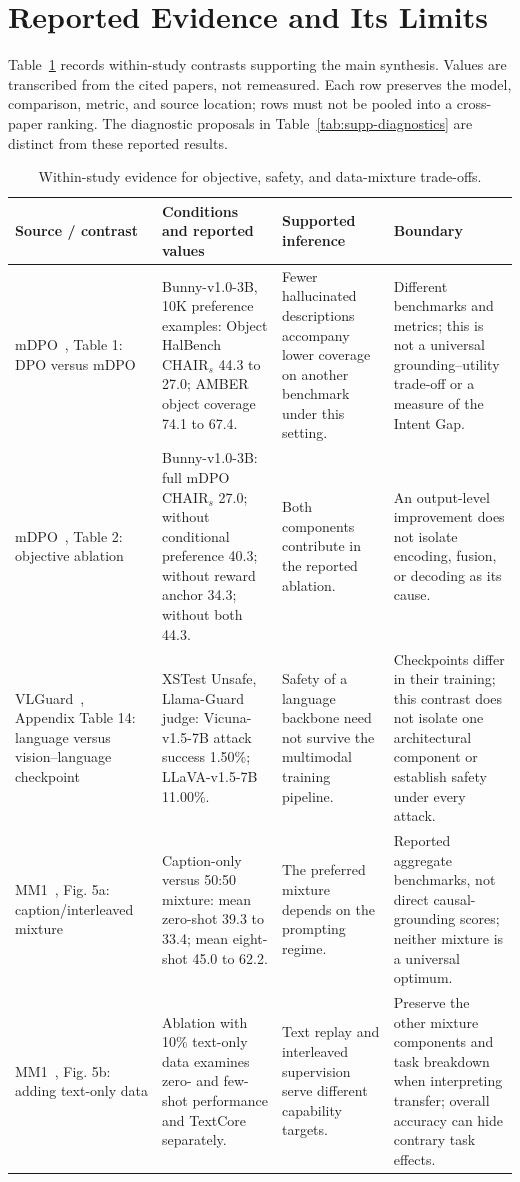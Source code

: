 \documentclass[10pt,onecolumn,journal,compsoc]{IEEEtran}
\begin{document}
\section{Reported Evidence and Its Limits}
Table~\ref{tab:supp-evidence} records within-study contrasts supporting the main synthesis. Values are transcribed from the cited papers, not remeasured. Each row preserves the model, comparison, metric, and source location; rows must not be pooled into a cross-paper ranking. The diagnostic proposals in Table~\ref{tab:supp-diagnostics} are distinct from these reported results.
\begin{table}[H]
\caption{Within-study evidence for objective, safety, and data-mixture trade-offs.}
\label{tab:supp-evidence}
\centering\small
\setlength{\tabcolsep}{5pt}\renewcommand{\arraystretch}{1.22}
\begin{tabularx}{\textwidth}{>{\raggedright\arraybackslash}p{}XXX}
\toprule\rowcolor{surveyheader}
\textbf{Source / contrast} & \textbf{Conditions and reported values} & \textbf{Supported inference} & \textbf{Boundary}\\\midrule
mDPO~\cite{wang2024mdpo}, Table 1: DPO versus mDPO & Bunny-v1.0-3B, 10K preference examples: Object HalBench CHAIR$_s$ 44.3 to 27.0; AMBER object coverage 74.1 to 67.4. & Fewer hallucinated descriptions accompany lower coverage on another benchmark under this setting. & Different benchmarks and metrics; this is not a universal grounding--utility trade-off or a measure of the Intent Gap.\\
mDPO~\cite{wang2024mdpo}, Table 2: objective ablation & Bunny-v1.0-3B: full mDPO CHAIR$_s$ 27.0; without conditional preference 40.3; without reward anchor 34.3; without both 44.3. & Both components contribute in the reported ablation. & An output-level improvement does not isolate encoding, fusion, or decoding as its cause.\\
VLGuard~\cite{zong2024vlguard}, Appendix Table 14: language versus vision--language checkpoint & XSTest Unsafe, Llama-Guard judge: Vicuna-v1.5-7B attack success 1.50\%; LLaVA-v1.5-7B 11.00\%. & Safety of a language backbone need not survive the multimodal training pipeline. & Checkpoints differ in their training; this contrast does not isolate one architectural component or establish safety under every attack.\\
MM1~\cite{mckinzie2024mm1}, Fig. 5a: caption/interleaved mixture & Caption-only versus 50:50 mixture: mean zero-shot 39.3 to 33.4; mean eight-shot 45.0 to 62.2. & The preferred mixture depends on the prompting regime. & Reported aggregate benchmarks, not direct causal-grounding scores; neither mixture is a universal optimum.\\
MM1~\cite{mckinzie2024mm1}, Fig. 5b: adding text-only data & Ablation with 10\% text-only data examines zero- and few-shot performance and TextCore separately. & Text replay and interleaved supervision serve different capability targets. & Preserve the other mixture components and task breakdown when interpreting transfer; overall accuracy can hide contrary task effects.\\
\bottomrule
\end{tabularx}
\end{table}
\end{document}
